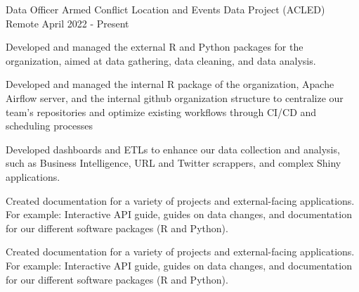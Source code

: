 

\begin{cventries}

  \cventry
    {Data Officer} %
    {Armed Conflict Location and Events Data Project (ACLED)} %
    {Remote} %
    {April 2022 - Present} %
    {
      \begin{cvitems} %
        \item {Developed and managed the external R and Python packages for the organization, aimed at data gathering, data cleaning, and data analysis.}
        \item {Developed and managed the internal R package of the organization, Apache Airflow server, and the internal github organization structure to centralize our team's repositories and optimize existing workflows through CI/CD and scheduling processes}
        \item {Developed dashboards and ETLs to enhance our data collection and analysis, such as Business Intelligence, URL and Twitter scrappers, and complex Shiny applications.}
        \item {Created documentation for a variety of projects and external-facing applications. For example: Interactive API guide, guides on data changes, and documentation for our different software packages (R and Python).}
        \item {Created documentation for a variety of projects and external-facing applications. For example: Interactive API guide, guides on data changes, and documentation for our different software packages (R and Python).}
        
      \end{cvitems}
    }


\end{cventries}
